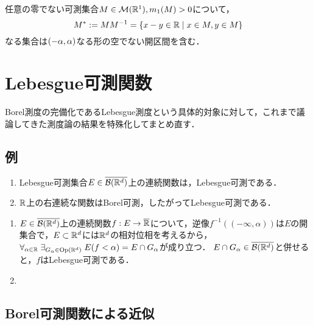 \documentclass[uplatex, dvipdfmx]{jsreport}
\begin{document}
\begin{theorem}
    任意の零でない可測集合$M\in\mathcal{M}(\mathbb{R}^1),m_1(M)>0$について，
    \[M^*:=MM^{-1}=\left\{x-y\in\mathbb{R}\mid x\in M,y\in M\right\}\]
    なる集合は$(-\alpha,\alpha)$なる形の空でない開区間を含む．
\end{theorem}

\section{Lebesgue可測関数}

\begin{tcolorbox}[colframe=ForestGreen, colback=ForestGreen!10!white,breakable,colbacktitle=ForestGreen!40!white,coltitle=black,fonttitle=\bfseries\sffamily,
title=]
    Borel測度の完備化であるLebesgue測度という具体的対象に対して，これまで議論してきた測度論の結果を特殊化してまとめ直す．
\end{tcolorbox}

\subsection{例}

\begin{proposition}[Lebesgue可測関数と位相]\label{prop-continuous-function-is-Lebesgue-measurable}\mbox{}
    \begin{enumerate}
        \item Lebesgue可測集合$E\in\overline{\mathcal{B}(\mathbb{R}^d)}$上の連続関数は，Lebesgue可測である．
        \item $\mathbb{R}$上の右連続な関数はBorel可測，したがってLebesgue可測である．
    \end{enumerate}
\end{proposition}
\begin{Proof}\mbox{}
    \begin{enumerate}
        \item $E\in\overline{\mathcal{B}(\mathbb{R}^d)}$上の連続関数$f:E\to\overline{\mathbb{R}}$について，逆像$f^{-1}((-\infty,\alpha))$は$E$の開集合で，$E\subset\mathbb{R}^d$には$\mathbb{R}^d$の相対位相を考えるから，
        $\forall_{\alpha\in\mathbb{R}}\;\exists_{G_\alpha\in\mathrm{Op}(\mathbb{R}^d)}\;E(f<\alpha)=E\cap G_\alpha$が成り立つ．
        $E\cap G_\alpha\in\overline{\mathcal{B}(\mathbb{R}^d)}$と併せると，$f$はLebesgue可測である．
        \item 

    \end{enumerate}
\end{Proof}

\subsection{Borel可測関数による近似}
\end{document}
